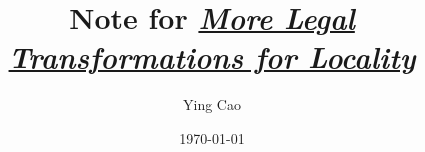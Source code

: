 \documentclass {article}
\title{Note for
\textit{\href{https://hal.inria.fr/inria-00001056/document}{More Legal Transformations for Locality}}}
\author{Ying Cao}
\date{\today}
\begin{document}
\maketitle
\tableofcontents
\newpage


{
\small
\raggedright

\begin{spacing}{1}

\end{spacing}
}
\end{document}
